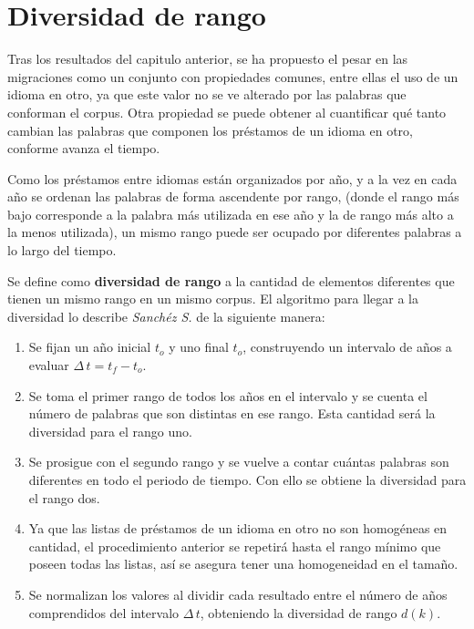 \chapter{Diversidad de rango}

Tras los resultados del capitulo anterior, se ha propuesto el pesar en las migraciones como un conjunto con propiedades comunes, entre ellas el uso de un idioma en otro,  ya que este valor no se ve alterado por las palabras que conforman el corpus. Otra propiedad se puede obtener al cuantificar qué tanto cambian las palabras que componen los préstamos de un idioma en otro, conforme avanza el tiempo. 
  
Como los préstamos entre idiomas están organizados por año, y a la vez en cada año se ordenan las palabras de forma ascendente por rango, (donde el rango más bajo corresponde a la palabra más utilizada en ese año y la de rango más alto a la menos utilizada), un mismo rango puede ser ocupado por diferentes palabras a lo largo del tiempo. 

Se define como \textbf{diversidad de rango} a la cantidad de elementos  diferentes que tienen un mismo rango en un mismo corpus. El algoritmo para llegar a la diversidad lo describe \textit{Sanchéz S.} \cite{tesis.sergio} de la siguiente manera:


\begin{enumerate}
		
	\item Se fijan un año inicial $t_{o}$ y uno final $t_{o}$, construyendo un intervalo de años a evaluar $\Delta\,t = t_{f}- t_{o}$.
	
	\item Se toma el primer rango de todos los años en el intervalo y se cuenta el número de palabras que son distintas en ese rango. Esta cantidad será la diversidad para el rango uno.
	
	\item Se prosigue con el segundo rango y se vuelve a contar cuántas palabras son diferentes en todo el periodo de tiempo.  Con ello se obtiene la diversidad para el rango dos. 
	
	\item Ya que las listas de préstamos de un idioma en otro no son homogéneas en cantidad, el procedimiento anterior se repetirá hasta el rango mínimo que poseen todas las listas,  así se asegura tener una homogeneidad en el tamaño.
	
	\item Se normalizan los valores al dividir cada resultado entre el número de años comprendidos del intervalo $\Delta\,t$, obteniendo  la diversidad de rango $d(k)$.
	
\end{enumerate}

